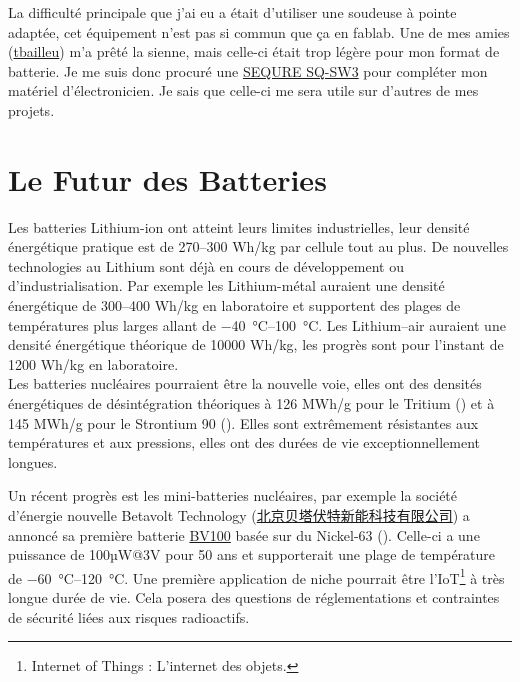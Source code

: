 \documentclass[a4paper,11pt]{article}
\newcommand{\SixtyThreeNi}[0]{\ce{^63Ni}}
\newcommand{\ThreeH}[0]{\ce{^3H}}
\newcommand{\NinetySr}[0]{\ce{_9_0Sr}}
\begin{document}
\begin{blogmain}
La difficulté principale que j'ai eu a était d'utiliser une soudeuse à pointe adaptée, cet équipement n'est pas si commun que ça en fablab. Une de mes amies (\href{https://github.com}{tbailleu}) m'a  prêté la sienne, mais celle-ci était trop légère pour mon format de batterie.
Je me suis donc procuré une \href{https://sequremall.com/products/sequre-sw3-energy-storage-spotwelder-lithium-battery-spotwelding}{SEQURE SQ-SW3} pour compléter mon matériel d'électronicien. Je sais que celle-ci me sera utile sur d'autres de mes projets.

\section{Le Futur des Batteries}
Les batteries Lithium-ion ont atteint leurs limites industrielles, leur densité énergétique pratique est de 270–300 Wh/kg par cellule tout au plus.
De nouvelles technologies au Lithium sont déjà en cours de développement ou d'industrialisation. Par exemple les Lithium-métal auraient une densité énergétique de 300–400 Wh/kg en laboratoire et supportent des plages de températures plus larges allant de \SIrange{-40}{100}{\celsius}. Les Lithium–air auraient une densité énergétique théorique de 10000 Wh/kg, les progrès sont pour l'instant de 1200 Wh/kg en laboratoire. \\

Les batteries nucléaires pourraient être la nouvelle voie, elles ont des densités énergétiques de désintégration théoriques à 126 MWh/g pour le Tritium (\ThreeH) et à 145 MWh/g pour le Strontium 90 (\NinetySr). Elles sont extrêmement résistantes aux températures et aux pressions, elles ont des durées de vie exceptionnellement longues.

Un récent progrès est les mini-batteries nucléaires, par exemple la société d'énergie nouvelle Betavolt Technology (\href{https://www.betavolt.tech}{\foreignlanguage{chinese}{北京贝塔伏特新能科技有限公司}}) a annoncé sa première batterie \href{https://www.betavolt.tech/cp_1449509.html}{BV100} basée sur du Nickel-63 (\SixtyThreeNi). Celle-ci a une puissance de 100µW@3V pour 50 ans et supporterait une plage de température de \SIrange{-60}{120}{\celsius}.
Une première application de niche pourrait être l'IoT\footnote{Internet of Things : L'internet des objets.} à très longue durée de vie. Cela posera des questions de réglementations et contraintes de sécurité liées aux risques radioactifs.
\end{blogmain}
\end{document}
